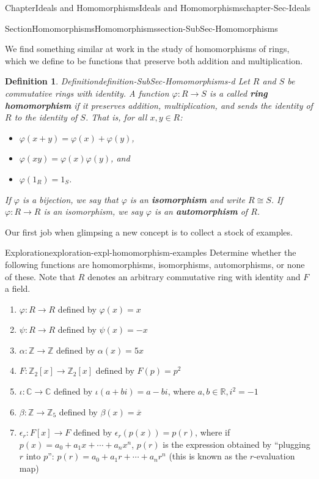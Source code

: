 \documentclass[oneside,10pt,]{book}
\newcommand{\terminology}[1]{\textbf{#1}}
\numberwithin{equation}{section}
\def\p{\varphi}
\def\C{{\mathbb C}}
\def\Z{{\mathbb Z}}
\def\R{{\mathbb R}}
\newtheorem{definition}[theorem]{Definition}
\begin{document}
\begin{chapterptx}{Chapter}{Ideals and Homomorphisms}{}{Ideals and Homomorphisms}{}{}{chapter-Sec-Ideals}
\begin{sectionptx}{Section}{Homomorphisms}{}{Homomorphisms}{}{}{section-SubSec-Homomorphisms}
\begin{introduction}{}
\par
We find something similar at work in the study of homomorphisms of rings, which we define to be functions that preserve both addition and multiplication.%
\end{introduction}%
\begin{definition}{Definition}{}{definition-SubSec-Homomorphisms-d}%
Let \(R\) and \(S\) be commutative rings with identity. A function \(\p : R\to S\) is a called \terminology{ring homomorphism} if it preserves addition, multiplication, and sends the identity of \(R\) to the identity of \(S\). That is, for all \(x,y\in R\):%
\begin{itemize}[label=\textbullet]
\item{}\(\p(x+y) = \p(x) + \p(y)\),%
\item{}\(\p(xy) = \p(x)\p(y)\), and%
\item{}\(\p(1_R) = 1_S\).%
\end{itemize}
If \(\p\) is a bijection, we say that \(\p\) is an \terminology{isomorphism} and write \(R\cong S\). If \(\p : R\to R\) is an isomorphism, we say \(\p\) is an \terminology{automorphism} of \(R\).%
\end{definition}
Our first job when glimpsing a new concept is to collect a stock of examples.%
\begin{exploration}{Exploration}{}{exploration-expl-homomorphism-examples}%
Determine whether the following functions are homomorphisms, isomorphisms, automorphisms, or none of these. Note that \(R\) denotes an arbitrary commutative ring with identity and \(F\) a field.%
%
\begin{enumerate}
\item{}\(\p : R\to R\) defined by \(\p(x)=x\)%
\item{}\(\psi : R\to R\) defined by \(\psi(x)=-x\)%
\item{}\(\alpha : \Z\to \Z\) defined by \(\alpha(x)=5x\)%
\item{}\(F : \Z_2[x]\to \Z_2[x]\) defined by \(F(p) = p^2\)%
\item{}\(\iota : \C\to \C\) defined by \(\iota(a+bi)=a-bi\), where \(a,b\in \R, i^2 = -1\)%
\item{}\(\beta : \Z\to \Z_{5}\) defined by \(\beta(x) = \overline{x}\)%
\item{}\(\epsilon_r : F[x] \to F\) defined by \(\epsilon_r(p(x)) = p(r)\), where if \(p(x) = a_0 + a_1 x + \cdots + a_n x^n\), \(p(r)\) is the expression obtained by ``plugging \(r\) into \(p\)'': \(p(r) = a_0 + a_1 r + \cdots + a_n r^n\) (this is known as the \(r\)-evaluation map)%

\end{enumerate}
\end{exploration}
\end{sectionptx}
\end{chapterptx}
\end{document}
